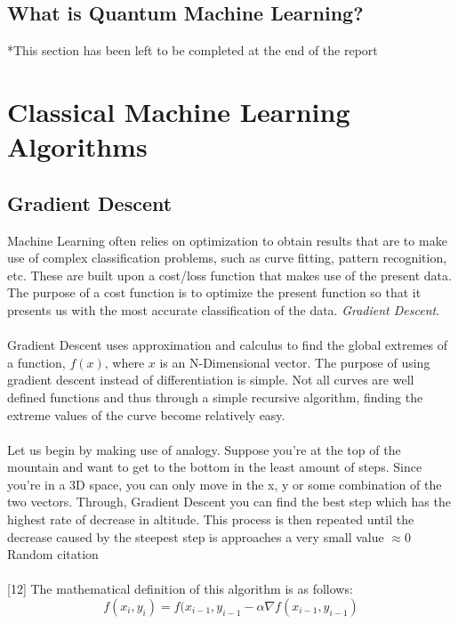 \documentclass[hidelinks,11pt]{article}
\begin{document}
\subsection{What is Quantum Machine Learning?}

*This section has been left to be completed at the end of the report

\newpage
\section{Classical Machine Learning Algorithms}
\subsection{Gradient Descent}

	Machine Learning often relies on optimization to obtain results that are to make use of complex classification problems, such as curve fitting, pattern recognition, etc. These are built upon a cost/loss function that makes use of the present data. The purpose of a cost function is to optimize the present function so that it presents us with the most accurate classification of the data. \textit{Gradient Descent}.
	\paragraph{}
	Gradient Descent uses approximation and calculus to find the global extremes of a function, $f(x)$, where $x$ is an N-Dimensional vector. The purpose of using gradient descent instead of differentiation is simple. Not all curves are well defined functions and thus through a simple recursive algorithm, finding the extreme values of the curve become relatively easy. 
	\paragraph{}
	Let us begin by making use of analogy. Suppose you're at the top of the mountain and want to get to the bottom in the least amount of steps. Since you're in a 3D space, you can only move in the x, y or some combination of the two vectors. Through, Gradient Descent you can find the best step which has the highest rate of decrease in altitude. This process is then repeated until the decrease caused by the steepest step is approaches a very small value $\approx 0$ Random citation \cite{BOOK:1} 
	\paragraph{}
	[12] The mathematical definition of this algorithm is as follows:  
	$$f(x_i, y_i) = f(x_{i-1}, y_{i-1} - \alpha\nabla f(x_{i-1}, y_{i-1})$$
\end{document}
